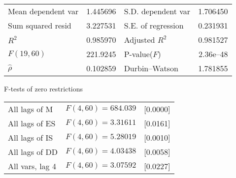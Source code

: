 \documentclass[11pt]{article}
\begin{document}
\begin{center}
\vspace{1ex}
\begin{tabular}{lrlr}
Mean dependent var &  1.445696 & S.D. dependent var &  1.706450 \\
Sum squared resid &  3.227531 & S.E. of regression &  0.231931 \\
$R^2$ &  0.985970 & Adjusted $R^2$ &  0.981527 \\
$F(19, 60)$ &  221.9245 & P-value($F$) &  2.36\textrm{e--48} \\
$\hat{\rho}$ &  0.102859 & Durbin--Watson &  1.781855 \\
\end{tabular}


\end{center}

\begin{center}
F-tests of zero restrictions\\[1em]
\begin{tabular}{lll}
All lags of M & $F(4, 60) = 684.039$ & [0.0000]\\
All lags of ES & $F(4, 60) = 3.31611$ & [0.0161]\\
All lags of IS & $F(4, 60) = 5.28019$ & [0.0010]\\
All lags of DD & $F(4, 60) = 4.03438$ & [0.0058]\\
All vars, lag 4 & $F(4, 60) = 3.07592$ & [0.0227]\\
\end{tabular}
\end{center}

\clearpage
\end{document}
